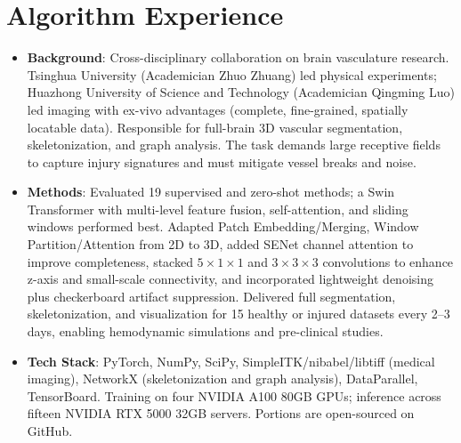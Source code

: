 \documentclass{resume}
\begin{document}
	
	
	\section{Algorithm Experience}
	
	\begin{itemize}
		\item \textbf{Background}: Cross-disciplinary collaboration on brain vasculature research. Tsinghua University (Academician Zhuo Zhuang) led physical experiments; Huazhong University of Science and Technology (Academician Qingming Luo) led imaging with ex-vivo advantages (complete, fine-grained, spatially locatable data). Responsible for full-brain 3D vascular segmentation, skeletonization, and graph analysis. The task demands large receptive fields to capture injury signatures and must mitigate vessel breaks and noise.
		
		\item \textbf{Methods}: Evaluated 19 supervised and zero-shot methods; a Swin Transformer with multi-level feature fusion, self-attention, and sliding windows performed best. Adapted Patch Embedding/Merging, Window Partition/Attention from 2D to 3D, added SENet channel attention to improve completeness, stacked $5 \times 1 \times 1$ and $3 \times 3 \times 3$ convolutions to enhance z-axis and small-scale connectivity, and incorporated lightweight denoising plus checkerboard artifact suppression. Delivered full segmentation, skeletonization, and visualization for 15 healthy or injured datasets every 2–3 days, enabling hemodynamic simulations and pre-clinical studies.
		
		\item \textbf{Tech Stack}: PyTorch, NumPy, SciPy, SimpleITK/nibabel/libtiff (medical imaging), NetworkX (skeletonization and graph analysis), DataParallel, TensorBoard. Training on four NVIDIA A100 80GB GPUs; inference across fifteen NVIDIA RTX 5000 32GB servers. Portions are open-sourced on GitHub.
		
	\end{itemize}
	
	
\end{document}
